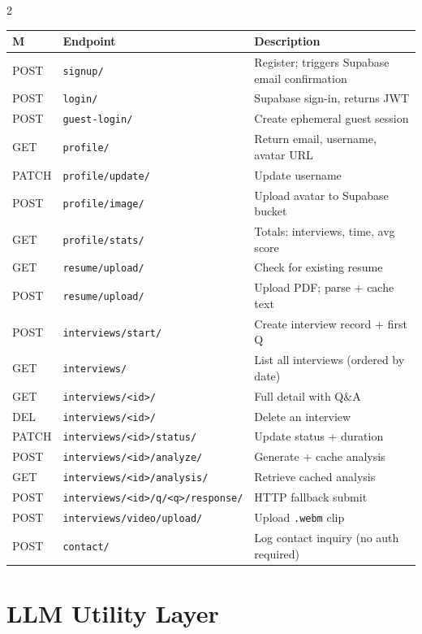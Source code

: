 \documentclass[10pt, a4paper]{article}
\begin{document}
\begin{multicols}{2}
\begin{center}
\scriptsize
\begin{tabular}{@{}p{0.4cm} p{3.3cm} p{2.6cm}@{}}
\toprule
\textbf{M} & \textbf{Endpoint} & \textbf{Description} \\
\midrule
POST & \texttt{signup/} & Register; triggers Supabase email confirmation \\
POST & \texttt{login/} & Supabase sign-in, returns JWT \\
POST & \texttt{guest-login/} & Create ephemeral guest session \\
\midrule
GET  & \texttt{profile/} & Return email, username, avatar URL \\
PATCH& \texttt{profile/update/} & Update username \\
POST & \texttt{profile/image/} & Upload avatar to Supabase bucket \\
GET  & \texttt{profile/stats/} & Totals: interviews, time, avg score \\
\midrule
GET  & \texttt{resume/upload/} & Check for existing resume \\
POST & \texttt{resume/upload/} & Upload PDF; parse + cache text \\
\midrule
POST & \texttt{interviews/start/} & Create interview record + first Q \\
GET  & \texttt{interviews/} & List all interviews (ordered by date) \\
GET  & \texttt{interviews/<id>/} & Full detail with Q\&A \\
DEL  & \texttt{interviews/<id>/} & Delete an interview \\
PATCH& \texttt{interviews/<id>/status/} & Update status + duration \\
POST & \texttt{interviews/<id>/analyze/} & Generate + cache analysis \\
GET  & \texttt{interviews/<id>/analysis/} & Retrieve cached analysis \\
POST & \texttt{interviews/<id>/q/<q>/response/} & HTTP fallback submit \\
POST & \texttt{interviews/video/upload/} & Upload \texttt{.webm} clip \\
\midrule
POST & \texttt{contact/} & Log contact inquiry (no auth required) \\
\bottomrule
\end{tabular}
\end{center}

\section{LLM Utility Layer}


\end{multicols}
\end{document}
